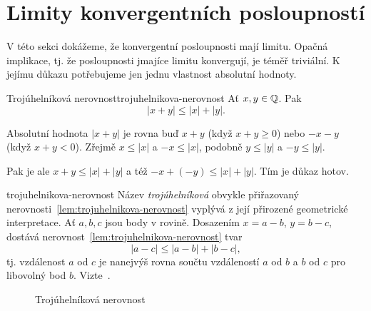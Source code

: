\section{Limity konvergentních posloupností}
\label{sec:limity-konvergentnich-posloupnosti}

V této sekci dokážeme, že konvergentní posloupnosti mají limitu. Opačná
implikace, tj. že posloupnosti jmajíce limitu konvergují, je téměř triviální. K
jejímu důkazu potřebujeme jen jednu vlastnost absolutní hodnoty.

\begin{lemma}{Trojúhelníková nerovnost}{trojuhelnikova-nerovnost}
 Ať $x,y \in \mathbb{Q}$. Pak
 \[
  |x + y| \leq |x| + |y|.
 \]
\end{lemma}
\begin{lemproof}
 Absolutní hodnota $|x+y|$ je rovna buď $x + y$ (když $x+y \geq 0$) nebo $-x-y$
 (když $x+y<0$). Zřejmě $x \leq |x|$ a $-x \leq |x|$, podobně $y \leq |y|$ a
 $-y \leq |y|$.

 Pak je ale $x + y \leq |x| + |y|$ a též $-x+(-y) \leq |x| + |y|$. Tím je důkaz
 hotov.
\end{lemproof}

\begin{remark}{}{trojuhelnikova-nerovnost}
 Název \emph{trojúhelníková} obvykle přiřazovaný
 nerovnosti~\ref{lem:trojuhelnikova-nerovnost} vyplývá z její přirozené
 geometrické interpretace. Ať $a,b,c$ jsou body v rovině. Dosazením $x = a - b$,
 $y = b - c$, dostává nerovnost~\ref{lem:trojuhelnikova-nerovnost}
 tvar
 \[
  |a - c| \leq |a - b| + |b - c|,
 \]
 tj. vzdálenost $a$ od $c$ je nanejvýš rovna součtu vzdáleností $a$ od $b$ a $b$
 od $c$ pro libovolný bod $b$.
 Vizte~.
 \begin{figure}[H]
  \centering

  \caption{Trojúhelníková nerovnost}
  \label{fig:trojuhelnikova-nerovnost}
 \end{figure}
\end{remark}

